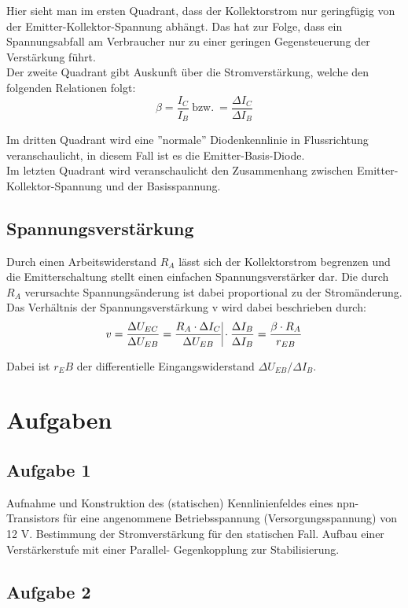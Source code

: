 \documentclass{article}
\begin{document}
Hier sieht man im ersten Quadrant, dass der Kollektorstrom nur geringfügig von der Emitter-Kollektor-Spannung abhängt. Das hat zur Folge, dass ein Spannungsabfall am Verbraucher nur zu einer geringen Gegensteuerung der Verstärkung führt.\\
Der zweite Quadrant gibt Auskunft über die Stromverstärkung, welche den folgenden Relationen folgt:
\begin{equation}
\beta =\frac{I_C}{I_B}\ \text{bzw.}\ =\frac{\Delta I_C}{\Delta I_B}
\end{equation}

Im dritten Quadrant wird eine ''normale'' Diodenkennlinie in Flussrichtung veranschaulicht, in diesem Fall ist es die Emitter-Basis-Diode.\\

Im letzten Quadrant wird veranschaulicht den Zusammenhang zwischen Emitter-Kollektor-Spannung und der Basisspannung.

\subsection{Spannungsverstärkung}
Durch einen Arbeitswiderstand \(R_A\) lässt sich der Kollektorstrom begrenzen und die Emitterschaltung stellt einen einfachen Spannungsverstärker dar. Die durch \(R_A\) verursachte Spannungsänderung ist dabei proportional zu der Stromänderung.
Das Verhältnis der Spannungsverstärkung v wird dabei beschrieben durch:
\begin{equation}
v=\frac{\Delta U_{EC}}{\Delta U_{EB}}=\frac{R_A \cdot \Delta I_C}{\Delta U_{EB}} \vline \cdot\frac{\Delta I_B}{\Delta I_B} =\frac{\beta \cdot R_A}{r_{EB}}
\end{equation} 

Dabei ist \(r_EB\) der differentielle Eingangswiderstand \(\Delta U_{EB}/\Delta I_B\).
\newpage
\section{Aufgaben}
\subsection{Aufgabe 1}
Aufnahme und Konstruktion des (statischen) Kennlinienfeldes eines npn-Transistors für eine angenommene Betriebsspannung (Versorgungsspannung) von 12 V. Bestimmung der Stromverstärkung für den statischen Fall. Aufbau einer Verstärkerstufe mit einer Parallel- Gegenkopplung zur Stabilisierung.

\subsection{Aufgabe 2}
\end{document}
